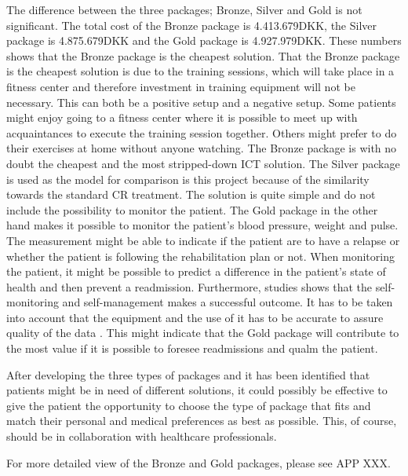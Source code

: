 The difference between the three packages; Bronze, Silver and Gold is not significant. The total cost of the Bronze package is 4.413.679DKK, the Silver package is 4.875.679DKK and the Gold package is 4.927.979DKK. These numbers shows that the Bronze package is the cheapest solution. That the Bronze package is the cheapest solution is due to the training sessions, which will take place in a fitness center and therefore investment in training equipment will not be necessary. This can both be a positive setup and a negative setup. Some patients might enjoy going to a fitness center where it is possible to meet up with acquaintances to execute the training session together. Others might prefer to do their exercises at home without anyone watching. The Bronze package is with no doubt the cheapest and the most stripped-down ICT solution. The Silver package is used as the model for comparison is this project because of the similarity towards the standard CR treatment. The solution is quite simple and do not include the possibility to monitor the patient. The Gold package in the other hand makes it possible to monitor the patient's blood pressure, weight and pulse. The measurement might be able to indicate if the patient are to have a relapse or whether the patient is following the rehabilitation plan or not. When monitoring the patient, it might be possible to predict a difference in the patient’s state of health and then prevent a readmission. Furthermore, studies shows that the self-monitoring and self-management makes a successful outcome. It has to be taken into account that the equipment and the use of it has to be accurate to assure quality of the data \cite{considerations, NationalBoardofHealth}. This might indicate that the Gold package will contribute to the most value if it is possible to foresee readmissions and qualm the patient.

After developing the three types of packages and it has been identified that patients might be in need of different solutions, it could possibly be effective to give the patient the opportunity to choose the type of package that fits and match their personal and medical preferences as best as possible. This, of course, should be in collaboration with healthcare professionals.  

For more detailed view of the Bronze and Gold packages, please see APP XXX.




 




